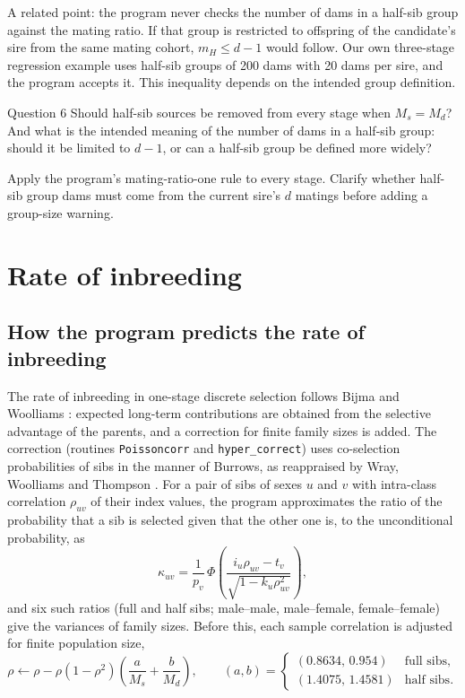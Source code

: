 \documentclass[11pt]{article}
\newcommand{\src}[1]{\texttt{#1}}
\begin{document}
A related point: the program never checks the number of dams in a half-sib group against the mating ratio. If that group is restricted to offspring of the candidate's sire from the same mating cohort, $m_H\le d-1$ would follow. Our own three-stage regression example uses half-sib groups of 200 dams with 20 dams per sire, and the program accepts it. This inequality depends on the intended group definition.

\begin{question}{Question 6}
Should half-sib sources be removed from every stage when $M_s=M_d$? And what is the intended meaning of the number of dams in a half-sib group: should it be limited to $d-1$, or can a half-sib group be defined more widely?
\end{question}
\begin{recommend}
Apply the program's mating-ratio-one rule to every stage. Clarify whether half-sib group dams must come from the current sire's $d$ matings before adding a group-size warning.
\end{recommend}

\section{Rate of inbreeding}\label{sec:inbreeding}

\subsection{How the program predicts the rate of inbreeding}
The rate of inbreeding in one-stage discrete selection follows Bijma and Woolliams \cite{bijmawoolliams2000}: expected long-term contributions are obtained from the selective advantage of the parents, and a correction for finite family sizes is added. The correction (routines \src{Poissoncorr} and \src{hyper\_correct}) uses co-selection probabilities of sibs in the manner of Burrows, as reappraised by Wray, Woolliams and Thompson \cite{wray1990}. For a pair of sibs of sexes $u$ and $v$ with intra-class correlation $\rho_{uv}$ of their index values, the program approximates the ratio of the probability that a sib is selected given that the other one is, to the unconditional probability, as
\begin{equation}\label{eq:kappa}
\kappa_{uv}=\frac{1}{p_v}\,\Phi\!\left(\frac{i_u\rho_{uv}-t_v}{\sqrt{1-k_u\rho_{uv}^2}}\right),
\end{equation}
and six such ratios (full and half sibs; male--male, male--female, female--female) give the variances of family sizes. Before this, each sample correlation is adjusted for finite population size,
\[
\rho \leftarrow \rho-\rho(1-\rho^2)\left(\frac{a}{M_s}+\frac{b}{M_d}\right),\qquad
(a,b)=\begin{cases}(0.8634,\,0.954)&\text{full sibs},\\(1.4075,\,1.4581)&\text{half sibs}.\end{cases}
\]
\end{document}
